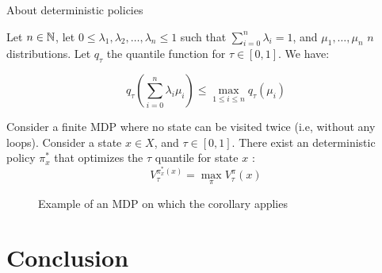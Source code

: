 \documentclass[10pt]{beamer}
\begin{document}
\begin{frame}{About deterministic policies}
    \begin{lemma}
        Let $n \in \mathbb{N}$, let $0 \leq \lambda_1,\lambda_2,\dots,\lambda_n \leq 1$ such that $\sum_{i = 0}^{n} \lambda_i = 1$, and $\mu_1,\dots, \mu_n $ $n$ distributions. Let $q_\tau$ the quantile function for $\tau \in [0,1]$. We have:
    
        \[ q_\tau \left( \sum_{i=0}^{n} \lambda_i \mu_i\right) \leq \max_{1 \leq i \leq n} q_\tau ( \mu_i) \]
    \end{lemma}
    \begin{Corollary}
        Consider a finite MDP where no state can be visited twice (i.e, without any loops). Consider a state $x \in X$, and $\tau \in [0,1]$. There exist an deterministic policy $\pi^{*}_x$ that optimizes the $\tau$ quantile for state $x$ :
        \[ V_\tau^{\pi^{*}_x(x)} = \max_\pi V_\tau^\pi(x)\]
    \end{Corollary}
\end{frame}

\begin{frame}
    \begin{figure}[!ht]
        \centering
        \caption{Example of an MDP on which the corollary applies}
    \end{figure}
\end{frame}

\section{Conclusion}
\end{document}
